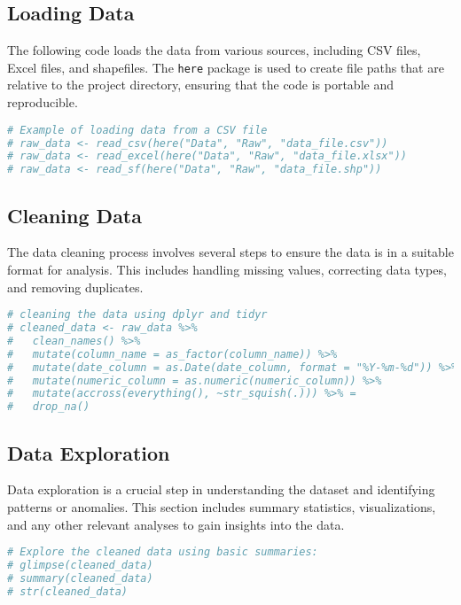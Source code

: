 \documentclass[
  12pt,
]{article}
\newcommand{\passthrough}[1]{#1}
\begin{document}
\subsection{Loading Data}\label{loading-data}

The following code loads the data from various sources, including CSV
files, Excel files, and shapefiles. The \passthrough{\lstinline!here!}
package is used to create file paths that are relative to the project
directory, ensuring that the code is portable and reproducible.

\begin{lstlisting}[language=R]
# Example of loading data from a CSV file
# raw_data <- read_csv(here("Data", "Raw", "data_file.csv"))
# raw_data <- read_excel(here("Data", "Raw", "data_file.xlsx"))
# raw_data <- read_sf(here("Data", "Raw", "data_file.shp"))
\end{lstlisting}

\subsection{Cleaning Data}\label{cleaning-data}

The data cleaning process involves several steps to ensure the data is
in a suitable format for analysis. This includes handling missing
values, correcting data types, and removing duplicates.

\begin{lstlisting}[language=R]
# cleaning the data using dplyr and tidyr
# cleaned_data <- raw_data %>%
#   clean_names() %>%
#   mutate(column_name = as_factor(column_name)) %>% 
#   mutate(date_column = as.Date(date_column, format = "%Y-%m-%d")) %>% 
#   mutate(numeric_column = as.numeric(numeric_column)) %>% 
#   mutate(accross(everything(), ~str_squish(.))) %>% =
#   drop_na()
\end{lstlisting}

\subsection{Data Exploration}\label{data-exploration}

Data exploration is a crucial step in understanding the dataset and
identifying patterns or anomalies. This section includes summary
statistics, visualizations, and any other relevant analyses to gain
insights into the data.

\begin{lstlisting}[language=R]
# Explore the cleaned data using basic summaries:
# glimpse(cleaned_data)
# summary(cleaned_data)
# str(cleaned_data)
\end{lstlisting}
\end{document}
